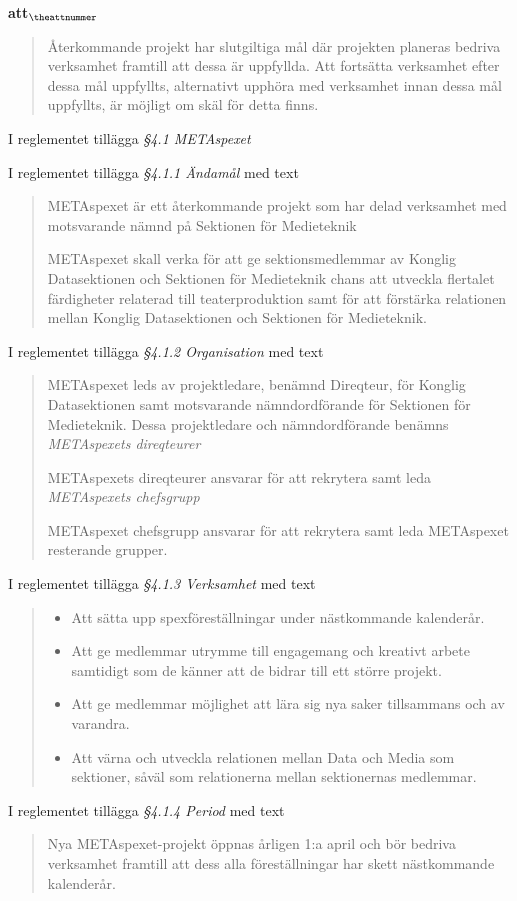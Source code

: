 \documentclass[a4paper]{article}
\begin{document}
\begin{list}{\bf att$_{\theattnummer}$}{}
\begin{quote}
        Återkommande projekt har slutgiltiga mål där projekten planeras bedriva verksamhet framtill
        att dessa är uppfyllda. Att fortsätta verksamhet efter dessa mål uppfyllts,
        alternativt upphöra med verksamhet innan dessa mål uppfyllts, är möjligt om skäl för detta
        finns.
    \end{quote}


\item I reglementet tillägga \textit{\S4.1 METAspexet}
\item I reglementet tillägga \textit{\S4.1.1 Ändamål} med text
    \begin{quote}
        METAspexet är ett återkommande projekt som har delad verksamhet med motsvarande nämnd på Sektionen för Medieteknik

        METAspexet skall verka för att ge sektionsmedlemmar av Konglig Datasektionen och Sektionen för Medieteknik chans att utveckla flertalet färdigheter relaterad till teaterproduktion samt för att förstärka relationen mellan Konglig Datasektionen och Sektionen för Medieteknik.
    \end{quote}
\item I reglementet tillägga \textit{\S4.1.2 Organisation} med text
    \begin{quote}
        METAspexet leds av projektledare, benämnd Direqteur, för Konglig Datasektionen samt motsvarande nämndordförande
        för Sektionen för Medieteknik. Dessa projektledare och nämndordförande benämns \textit{METAspexets direqteurer}

        METAspexets direqteurer ansvarar för att rekrytera samt leda \textit{METAspexets chefsgrupp}

        METAspexet chefsgrupp ansvarar för att rekrytera samt leda METAspexet resterande grupper.
    \end{quote}
\item I reglementet tillägga \textit{\S4.1.3 Verksamhet} med text
    \begin{quote}
        \begin{itemize}
            \item Att sätta upp spexföreställningar under nästkommande kalenderår.
            \item Att ge medlemmar utrymme till engagemang och kreativt arbete samtidigt som de känner att de bidrar till ett större projekt.
            \item Att ge medlemmar möjlighet att lära sig nya saker tillsammans och av varandra.
            \item Att värna och utveckla relationen mellan Data och Media som sektioner, såväl som relationerna mellan sektionernas medlemmar.
        \end{itemize}
    \end{quote}
\item I reglementet tillägga \textit{\S4.1.4 Period} med text
    \begin{quote}
        Nya METAspexet-projekt öppnas årligen 1:a april och bör bedriva verksamhet framtill att dess alla föreställningar har skett nästkommande kalenderår.


\end{quote}
\end{list}
\end{document}
